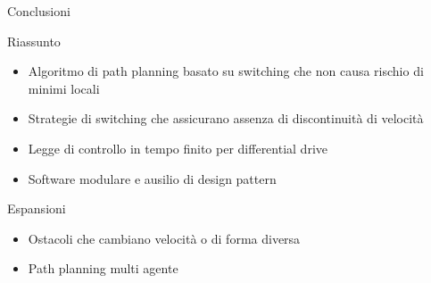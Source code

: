 \documentclass[handout]{beamer}
\begin{document}
\begin{frame}{Conclusioni}
\begin{block}{Riassunto}
\begin{itemize}
\item Algoritmo di path planning basato su switching che non causa rischio di minimi locali
\item Strategie di switching che assicurano assenza di discontinuità di velocità
\item Legge di controllo in tempo finito per differential drive
\item Software modulare e ausilio di design pattern
\end{itemize}
\end{block}

\begin{block}{Espansioni}
\begin{itemize}
\item Ostacoli che cambiano velocità o di forma diversa
\item Path planning multi agente
\end{itemize}
\end{block}

\end{frame}
\end{document}
